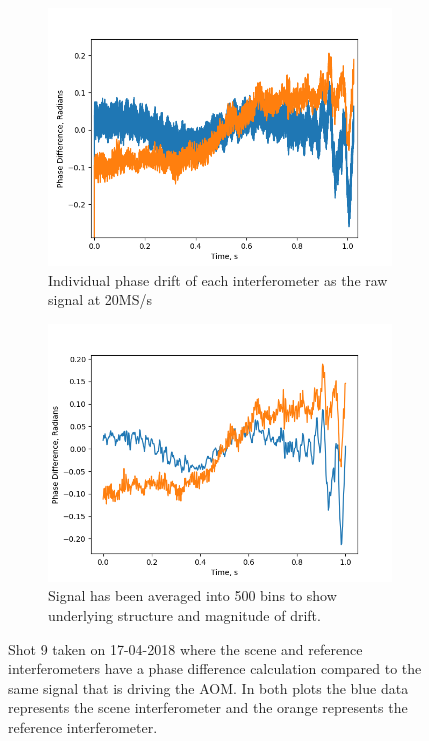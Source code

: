 \documentclass[12pt,a4paper,oneside]{report}
\begin{document}
\begin{figure}[H]
  \begin{subfigure}{.5\textwidth}
    \centering\captionsetup{width=.9\linewidth}
    \includegraphics[width=\textwidth,angle=0]{DImages/Phase_Difference_Blue___Scene_Orange___Reference_shot_9_Date_20180417.png}
    \caption{Individual phase drift of each interferometer as the raw signal at 20MS/s \\}
  \end{subfigure}
  \begin{subfigure}{.5\textwidth}
    \centering\captionsetup{width=.9\linewidth}
    \includegraphics[width=\textwidth, angle=0]{DImages/avr_2ch_shot_9_20180417.png}
    \caption{Signal has been averaged into 500 bins to show underlying structure and magnitude of drift.}
  \end{subfigure}
\caption{Shot 9 taken on 17-04-2018 where the scene and reference interferometers have a phase difference calculation compared to the same signal that is driving the AOM. In both plots the blue data represents the scene interferometer and the orange represents the reference interferometer.}
\label{fig:2-2ch-scene-ref}
\end{figure}
\end{document}
